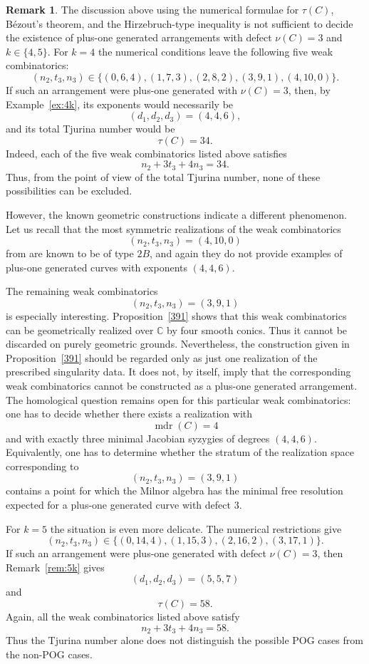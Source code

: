 \documentclass[11pt]{article}
\theoremstyle{plain}
\theoremstyle{definition}
\newtheorem{remark}[thm]{Remark}
\begin{document}
\begin{remark}
\label{rem:speculation-k4-k5}
The discussion above using the numerical
formulae for \(\tau(C)\), B\'ezout's theorem, and the Hirzebruch-type
inequality is not sufficient to decide the existence of plus-one generated
arrangements with defect \(\nu(C)=3\) and $k \in \{4,5\}$. For \(k=4\) the numerical
conditions leave the following five weak combinatorics:
\[
(n_2,t_3,n_3)\in
\{(0,6,4),(1,7,3),(2,8,2),(3,9,1),(4,10,0)\}.
\]
If such an arrangement were plus-one generated with \(\nu(C)=3\), then,
by Example~\ref{ex:4k}, its exponents would necessarily be
\[
(d_1,d_2,d_3)=(4,4,6),
\]
and its total Tjurina number would be
\[
\tau(C)=34.
\]
Indeed, each of the five weak combinatorics listed above satisfies
\[
n_2+3t_3+4n_3=34.
\]
Thus, from the point of view of the total Tjurina number, none of these
possibilities can be excluded.

However, the known geometric constructions indicate a different phenomenon.
Let us recall that the most symmetric
realizations of the weak combinatorics
\[
(n_2,t_3,n_3)=(4,10,0)
\]
from \cite[Proposition 4.3]{BJP} are known to be of type \(2B\), and again they do not provide examples of
plus-one generated curves with exponents \((4,4,6)\).

The remaining weak combinatorics
\[
(n_2,t_3,n_3)=(3,9,1)
\]
is especially interesting. Proposition~\ref{391} shows that this weak
combinatorics can be geometrically realized over \(\mathbb C\) by four smooth
conics. Thus it cannot be discarded on purely geometric grounds. Nevertheless,
the construction given in Proposition~\ref{391} should be regarded only as just one realization of the prescribed singularity data. It does not, by itself, imply that the corresponding weak combinatorics cannot be constructed as a plus-one generated arrangement. The homological
question remains open for this particular weak combinatorics: one has to decide
whether there exists a realization with
\[
\operatorname{mdr}(C)=4
\]
and with exactly three minimal Jacobian syzygies of degrees $(4, 4, 6)$.
Equivalently, one has to determine whether the stratum of the realization space
corresponding to
\[
(n_2,t_3,n_3)=(3,9,1)
\]
contains a point for which the Milnor algebra has the minimal free resolution
expected for a plus-one generated curve with defect \(3\).


For \(k=5\) the situation is even more delicate. The numerical restrictions
give
\[
(n_2,t_3,n_3)\in
\{(0,14,4),(1,15,3),(2,16,2),(3,17,1)\}.
\]
If such an arrangement were plus-one generated with defect \(\nu(C)=3\), then
Remark~\ref{rem:5k} gives
\[
(d_1,d_2,d_3)=(5,5,7)
\]
and
\[
\tau(C)=58.
\]
Again, all the weak combinatorics listed above satisfy
\[
n_2+3t_3+4n_3=58.
\]
Thus the Tjurina number alone does not distinguish the possible POG cases from
the non-POG cases.


\end{remark}
\end{document}
